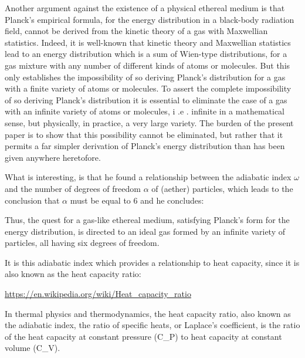 \documentclass[a4paper]{article}
\newcommand\textstyleNone[1]{#1}
\begin{document}
{\color[rgb]{0.101960786,0.101960786,0.101960786}
\textstyleNone{{\textquotedbl}Another argument against the existence of a physical ethereal medium is that Planck's
empirical formula, for the energy distribution in a black-body radiation field, cannot be derived from the kinetic
theory of a gas with Maxwellian statistics. Indeed, it is well-known that kinetic theory and Maxwellian statistics lead
to an energy distribution which is a sum of Wien-type distributions, for a gas mixture with any number of different
kinds of atoms or molecules. But this only establishes the impossibility of so deriving Planck's distribution for a gas
with a finite variety of atoms or molecules. To assert the complete impossibility of so deriving Planck's distribution
it is essential to eliminate the case of a gas with an infinite variety of atoms or molecules, i .e . infinite in a
mathematical sense, but physically, in practice, a very large variety. The burden of the present paper is to show that
this possibility cannot be eliminated, but rather that it permits a far simpler derivation of Planck's energy
distribution than has been given anywhere heretofore.{\textquotedbl}}}

{\color[rgb]{0.101960786,0.101960786,0.101960786}
\textstyleNone{What is interesting, is that he found a relationship between the adiabatic index $\omega $ and the number
of degrees of freedom $\alpha $ of (aether) particles, which leads to the conclusion that $\alpha $ must be equal to 6
and he concludes:}}

{\color[rgb]{0.101960786,0.101960786,0.101960786}
\textstyleNone{{\textquotedbl}Thus, the quest for a gas-like ethereal medium, satisfying Planck's form for the energy
distribution, is directed to an ideal gas formed by an infinite variety of particles, all having six degrees of
freedom.{\textquotedbl}}}

{\color[rgb]{0.101960786,0.101960786,0.101960786}
\textstyleNone{It is this adiabatic index which provides a relationship to heat capacity, since it is also known as the
heat capacity ratio:}}

{\color[rgb]{0.101960786,0.101960786,0.101960786}
\url{https://en.wikipedia.org/wiki/Heat_capacity_ratio}\textstyleNone{ }}

{\color[rgb]{0.101960786,0.101960786,0.101960786}
\textstyleNone{{\textquotedbl}In thermal physics and thermodynamics, the heat capacity ratio, also known as the
adiabatic index, the ratio of specific heats, or Laplace's coefficient, is the ratio of the heat capacity at constant
pressure (C\_P) to heat capacity at constant volume (C\_V).{\textquotedbl}}}
\end{document}
